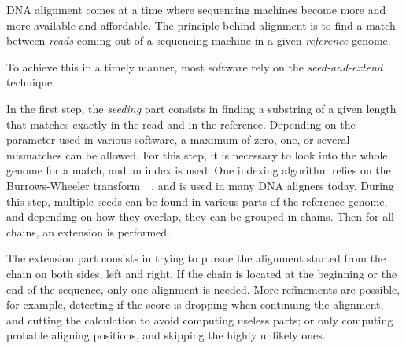 DNA alignment comes at a time where sequencing machines become more and more available and affordable. The principle behind alignment is to find a match between \emph{reads} coming out of a sequencing machine in a given \emph{reference} genome. 

To achieve this in a timely manner, most software rely on the \emph{seed-and-extend} technique.

In the first step, the \emph{seeding} part consists in finding a substring of a given length that matches exactly in the read and in the reference. Depending on the parameter used in various software, a maximum of zero, one, or several mismatches can be allowed. For this step, it is necessary to look into the whole genome for a match, and an index is used. One indexing algorithm relies on the Burrows-Wheeler transform~~\cite{BurrowsWheeler:align}, and is used in many DNA aligners today. During this step, multiple seeds can be found in various parts of the reference genome, and depending on how they overlap, they can be grouped in chains. Then for all chains, an extension is performed.

The extension part consists in trying to pursue the alignment started from the chain on both sides, left and right. If the chain is located at the beginning or the end of the sequence, only one alignment is needed. More refinements are possible, for example, detecting if the score is dropping when continuing the alignment, and cutting the calculation to avoid computing useless parts; or only computing probable aligning positions, and skipping the highly unlikely ones. %

